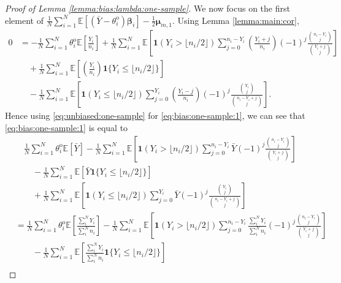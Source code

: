 \documentclass[12pt,letterpaper]{article}
\begin{document}
\begin{proof}[Proof of Lemma \ref{lemma:bias:lambda:one-sample}]
\noindent We now focus on the first element of $\displaystyle\frac{1}{N}\sum_{i=1}^N\mathbb{E}\left[\left(\bar{Y}-\theta_i^{\mathrm{o}}\right)\boldsymbol{\beta}_i\right]-\frac{1}{2}\boldsymbol{\mu}_{m,1}$. Using Lemma \ref{lemma:main:cor}, 
\begin{equation}\label{eq:unbiased:one-sample}
\begin{array}{rl}
0\!\!\!\!&=\displaystyle-\frac{1}{N}\sum_{i=1}^N\theta_i^{\mathrm{o}}\mathbb{E}\left[\frac{Y_i}{n_i}\right]+\frac{1}{N}\sum_{i=1}^N\mathbb{E}\left[\mathbf{1}(Y_{i} > \lfloor n_i/2\rfloor)\!\!\!\sum_{j=0}^{n_{i}-Y_{i}}\!\!\left(\frac{Y_i+j}{n_i}\right)(-1)^{j}\frac{\binom{n_i-Y_i}{j}}{\binom{Y_i+j}{j}}\right]\\
&\displaystyle\quad+\frac{1}{N}\sum_{i=1}^N\mathbb{E}\left[\left(\frac{Y_i}{n_i}\right)\mathbf{1}\{Y_i\leq \lfloor n_i/2\rfloor\}\right]\\
&\displaystyle\quad-\frac{1}{N}\sum_{i=1}^N\mathbb{E}\left[\mathbf{1}(Y_{i}\leq \lfloor n_i/2\rfloor)\sum_{j=0}^{Y_{i}}\left(\frac{Y_i-j}{n_i}\right)(-1)^{j}\frac{\binom{Y_i}{j}}{\binom{n_i-Y_i+j}{j}}\right].
\end{array}
\end{equation}
Hence using \eqref{eq:unbiased:one-sample} for \eqref{eq:bias:one-sample:1}, we can see that \eqref{eq:bias:one-sample:1} is equal to
\begin{equation}\label{eq:bias:one-sample:1:rewrite}
\begin{array}{rl}
&\quad\displaystyle\frac{1}{N}\sum_{i=1}^N\theta_i^{\mathrm{o}}\mathbb{E}\left[\bar{Y}\right]-\frac{1}{N}\sum_{i=1}^N\mathbb{E}\left[\mathbf{1}(Y_{i} > \lfloor n_i/2\rfloor)\!\!\!\sum_{j=0}^{n_{i}-Y_{i}}\!\!\bar{Y}(-1)^{j}\frac{\binom{n_i-Y_i}{j}}{\binom{Y_i+j}{j}}\right]\\
&\displaystyle\quad\quad-\frac{1}{N}\sum_{i=1}^N\mathbb{E}\left[\bar{Y}\mathbf{1}\{Y_i\leq \lfloor n_i/2\rfloor\}\right]\\
&\displaystyle\quad\quad+\frac{1}{N}\sum_{i=1}^N\mathbb{E}\left[\mathbf{1}(Y_{i}\leq \lfloor n_i/2\rfloor)\sum_{j=0}^{Y_{i}}\bar{Y}(-1)^{j}\frac{\binom{Y_i}{j}}{\binom{n_i-Y_i+j}{j}}\right]\\
&=\displaystyle\frac{1}{N}\sum_{i=1}^N\theta_i^{\mathrm{o}}\mathbb{E}\left[\frac{\sum_{i}^{N}Y_i}{\sum_{i}^{N}n_i}\right]-\frac{1}{N}\sum_{i=1}^N\mathbb{E}\left[\mathbf{1}(Y_{i} > \lfloor n_i/2\rfloor)\!\!\!\sum_{j=0}^{n_{i}-Y_{i}}\frac{\sum_{i}^{N}Y_i}{\sum_{i}^{N}n_i}(-1)^{j}\frac{\binom{n_i-Y_i}{j}}{\binom{Y_i+j}{j}}\right]\\
&\displaystyle\quad\quad-\frac{1}{N}\sum_{i=1}^N\mathbb{E}\left[\frac{\sum_{i}^{N}Y_i}{\sum_{i}^{N}n_i}\mathbf{1}\{Y_i\leq \lfloor n_i/2\rfloor\}\right]\\

\end{array}
\end{equation}
\end{proof}
\end{document}
